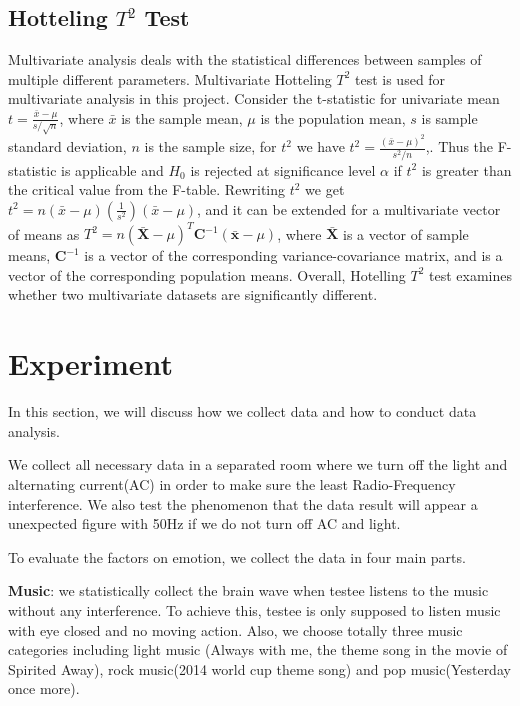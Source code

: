 \documentclass[letterpaper,twocolumn,10pt]{article}
\begin{document}
\subsection{Hotteling $T^2$ Test}

Multivariate analysis deals with the statistical differences between samples of multiple different parameters. Multivariate Hotteling $T^2$ test is used for multivariate analysis in this project. Consider the t-statistic for univariate mean $t=\frac{\bar{x}-\mu}{s/\sqrt{n}}$, where $\bar{x}$ is the sample mean, $\mu$  is the population mean, $s$ is sample standard deviation, $n$ is the sample size, for $t^2$ we have $t^2=\frac{(\bar{x}-\mu)^2}{s^2/n}$,. Thus the F-statistic is applicable and $H_0$ is rejected at significance level $\alpha$ if $t^2$ is greater than the critical value from the F-table. Rewriting $t^2$ we get $t^2=n(\bar{x}-\mu)\left( \frac{1}{s^2}\right) (\bar{x}-\mu)$, and it can be extended for a multivariate vector of means as $T^2=n(\bm{\bar{X}}-\mu)^T\bm{C}^{-1}(\bm{\bar{x}}-\mu)$, where $\bm{\bar{X}}$ is a vector of sample means, $\bm{C}^{-1}$ is a vector of the corresponding variance-covariance matrix, and is a vector of the corresponding population means. Overall, Hotelling $T^2$ test examines whether two multivariate datasets are significantly different.


\section{Experiment}
In this section, we will discuss how we collect data and how to conduct data analysis.

We collect all necessary data in a separated room where we turn off the light and alternating current(AC) in order to make sure the least Radio-Frequency interference. We also test the phenomenon that the data result will appear a unexpected figure with 50Hz if we do not turn off AC and light.

To evaluate the factors on emotion, we collect the data in four main parts. 

\noindent
{}
\setlength{\hangindent}{1em}
\textbf{Music}: we statistically collect the brain wave when testee listens to the music without any interference. To achieve this, testee is only supposed to listen music with eye closed and no moving action. Also, we choose totally three music categories including light music (Always with me, the theme song in the movie of Spirited Away), rock music(2014 world cup theme song) and pop music(Yesterday once more). 
\end{document}
